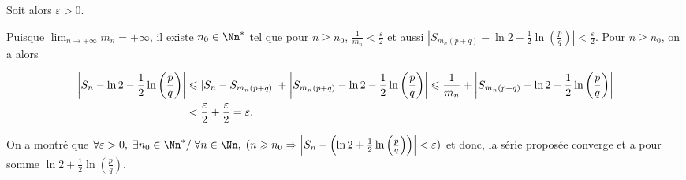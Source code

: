 {{Soit alors $\varepsilon>0$.

Puisque $\lim_{n \rightarrow +\infty}m_n=+\infty$, il existe $n_0\in\Nn^*$ tel que pour $n\geqslant n_0$, $\frac{1}{m_n}<\frac{\varepsilon}{2}$ et aussi $\left|S_{m_n(p+q)}-\ln2-\frac{1}{2}\ln\left(\frac{p}{q}\right)\right|<\frac{\varepsilon}{2}$. Pour $n\geqslant n_0$, on a alors

\begin{align*}\ensuremath
\left|S_{n}-\ln2 -\frac{1}{2}\ln\left(\frac{p}{q}\right)\right|&\leqslant|S_n-S_{m_n(p+q)}|+\left|S_{m_n(p+q)}-\ln2-\frac{1}{2}\ln\left(\frac{p}{q}\right)\right|\leqslant\frac{1}{m_n}+\left|S_{m_n(p+q)}-\ln2-\frac{1}{2}\ln\left(\frac{p}{q}\right)\right|\\
 &<\frac{\varepsilon}{2}+\frac{\varepsilon}{2}=\varepsilon.
\end{align*}

On a montré que $\forall \varepsilon>0,\;\exists n_0\in\Nn^*/\;\forall n\in\Nn,\;(n\geqslant n_0\Rightarrow\left|S_{n}-\left(\ln2 +\frac{1}{2}\ln\left(\frac{p}{q}\right)\right)\right|<\varepsilon)$ et donc, la série proposée converge et a pour somme $\ln2 +\frac{1}{2}\ln\left(\frac{p}{q}\right)$.
}
}
